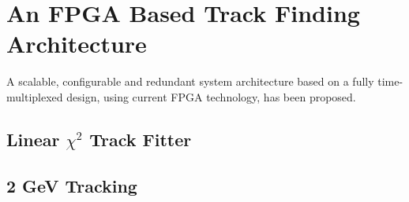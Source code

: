 \section{An FPGA Based Track Finding Architecture}

A scalable, configurable and redundant system architecture based on a fully time-multiplexed design, using current FPGA technology, has been proposed.

\subsection{Linear $\chi^{2}$ Track Fitter}

\subsection{2 GeV Tracking}

